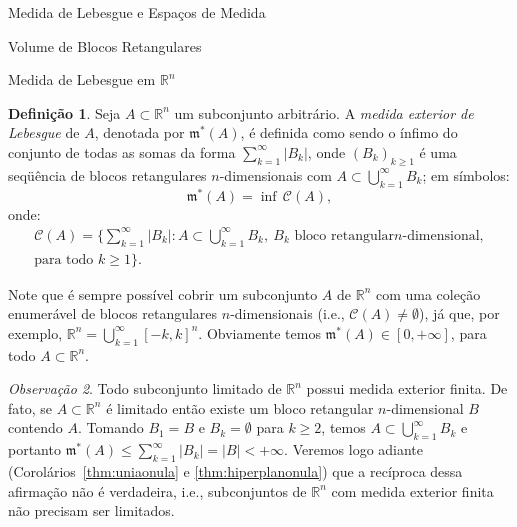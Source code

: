 \documentclass[oneside,final,11pt]{amsbook}
\newcommand{\R}{\mathds R}
\newcommand{\leb}{\mathfrak m}
\theoremstyle{remark}\newtheorem{exercise}{Exercício}[chapter]
\theoremstyle{remark}\newtheorem{*exercise}[exercise]{\hbox to 0pt{\hskip 0pt minus 1fil*}Exercício}
\theoremstyle{definition}\newtheorem{exdefin}{Definição}[chapter]
\theoremstyle{plain}\newtheorem{teo}{Teorema}[section]
\theoremstyle{plain}\newtheorem{lem}[teo]{Lema}
\theoremstyle{plain}\newtheorem{prop}[teo]{Proposição}
\theoremstyle{plain}\newtheorem{cor}[teo]{Corolário}
\theoremstyle{definition}\newtheorem{defin}[teo]{Definição}
\theoremstyle{remark}\newtheorem{rem}[teo]{Observação}
\theoremstyle{definition}\newtheorem{notation}[teo]{Notação}
\theoremstyle{definition}\newtheorem{convention}[teo]{Convenção}
\theoremstyle{definition}\newtheorem{example}[teo]{Exemplo}
\numberwithin{section}{chapter}
\numberwithin{equation}{section}
\begin{document}
\begin{chapter}{Medida de Lebesgue e Espaços de Medida}
\begin{section}{Volume de Blocos Retangulares}
\end{section}

\begin{section}[Medida de Lebesgue em $\R^n$]{Medida de Lebesgue em ${\R^n}$}
\label{sec:MedLebRn}

\begin{defin}
Seja $A\subset\R^n$ um subconjunto arbitrário. A {\em medida exterior de Lebesgue\/}
de $A$, denotada por
$\leb^*(A)$, é definida como sendo o ínfimo do conjunto de todas as somas da forma $\sum_{k=1}^\infty\vert B_k\vert$,
onde $(B_k)_{k\ge1}$ é uma seqüência de blocos retangulares $n$-dimensionais com $A\subset\bigcup_{k=1}^\infty B_k$;
em símbolos:
\index[simbolos]{$\leb^*(A)$}\[\leb^*(A)=\inf\,\mathcal C(A),\]
onde:
\begin{multline}\label{eq:defCA}
\mathcal C(A)=\Big\{\sum_{k=1}^\infty\vert B_k\vert:A\subset\bigcup_{k=1}^\infty B_k,\ \text{$B_k$ bloco retangular
$n$-dimensional},\\[-10pt]
\text{para todo $k\ge1$}\Big\}.
\end{multline}
\end{defin}
Note que é sempre possível cobrir um subconjunto $A$ de $\R^n$ com uma coleção enumerável de blocos retangulares $n$-dimensionais
(i.e., $\mathcal C(A)\ne\emptyset$),
já que, por exemplo, $\R^n=\bigcup_{k=1}^\infty[-k,k]^n$.
Obviamente temos $\leb^*(A)\in[0,+\infty]$, para todo $A\subset\R^n$.

\begin{rem}\label{thm:boundfinite}
Todo subconjunto limitado de $\R^n$ possui medida exterior finita. De fato,
se $A\subset\R^n$ é limitado então existe um bloco retangular $n$-dimensional $B$ contendo $A$.
Tomando $B_1=B$ e $B_k=\emptyset$ para $k\ge2$, temos $A\subset\bigcup_{k=1}^\infty B_k$
e portanto $\leb^*(A)\le\sum_{k=1}^\infty\vert B_k\vert=\vert B\vert<+\infty$.
Veremos logo adiante (Corolários~\ref{thm:uniaonula} e \ref{thm:hiperplanonula}) que a recíproca dessa afirmação não é verdadeira,
i.e., subconjuntos de $\R^n$ com medida exterior finita não precisam ser limitados.
\end{rem}


\end{section}
\end{chapter}
\end{document}
